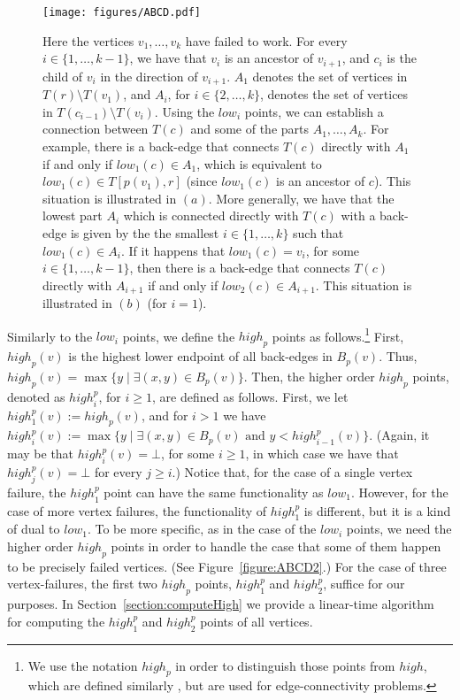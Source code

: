 \documentclass[11pt,a4paper]{article}
\begin{document}
\begin{figure}[h!]\centering
\texttt{[image: figures/ABCD.pdf]}
\caption{\small{Here the vertices $v_1,\dots,v_k$ have failed to work. For every $i\in\{1,\dots,k-1\}$, we have that $v_i$ is an ancestor of $v_{i+1}$, and $c_i$ is the child of $v_i$ in the direction of $v_{i+1}$. $A_1$ denotes the set of vertices in $T(r)\setminus T(v_1)$, and $A_i$, for $i\in\{2,\dots,k\}$, denotes the set of vertices in $T(c_{i-1})\setminus T(v_i)$. Using the $\mathit{low}_i$ points, we can establish a connection between $T(c)$ and some of the parts $A_1,\dots,A_k$. For example, there is a back-edge that connects $T(c)$ directly with $A_1$ if and only if $\mathit{low}_1(c)\in A_1$, which is equivalent to $\mathit{low}_1(c)\in T[p(v_1),r]$ (since $\mathit{low}_1(c)$ is an ancestor of $c$). This situation is illustrated in $(a)$. More generally, we have that the lowest part $A_i$ which is connected directly with $T(c)$ with a back-edge is given by the the smallest $i\in\{1,\dots,k\}$ such that $\mathit{low}_1(c)\in A_i$. If it happens that $\mathit{low}_1(c)=v_i$, for some $i\in\{1,\dots,k-1\}$, then there is a back-edge that connects $T(c)$ directly with $A_{i+1}$ if and only if $\mathit{low}_2(c)\in A_{i+1}$. This situation is illustrated in $(b)$ (for $i=1$).}}\label{figure:ABCD}
\end{figure}



Similarly to the $\mathit{low}_i$ points, we define the $\mathit{high}_p$ points as follows.\footnote{We use the notation $\mathit{high}_p$ in order to distinguish those points from $\mathit{high}$, which are defined similarly \cite{DBLP:conf/soda/Kosinas24}, but are used for edge-connectivity problems.} First, $\mathit{high}_p(v)$ is the highest lower endpoint of all back-edges in $B_p(v)$. Thus, $\mathit{high}_p(v)=\max\{y\mid \exists (x,y)\in B_p(v)\}$. Then, the higher order $\mathit{high}_p$ points, denoted as $\mathit{high}^p_i$, for $i\geq 1$, are defined as follows. First, we let $\mathit{high}^p_1(v):=\mathit{high}_p(v)$, and for $i>1$ we have $\mathit{high}^p_i(v):=\max\{y\mid \exists (x,y)\in B_p(v) \mbox{ and } y<\mathit{high}^p_{i-1}(v)\}$. (Again, it may be that $\mathit{high}^p_i(v)=\bot$, for some $i\geq 1$, in which case we have that $\mathit{high}^p_j(v)=\bot$ for every $j\geq i$.) Notice that, for the case of a single vertex failure, the $\mathit{high}^p_1$ point can have the same functionality as $\mathit{low}_1$. However, for the case of more vertex failures, the functionality of $\mathit{high}^p_1$ is different, but it is a kind of dual to $\mathit{low}_1$. To be more specific, as in the case of the $\mathit{low}_i$ points, we need the higher order $\mathit{high}_p$ points in order to handle the case that some of them happen to be precisely failed vertices. (See Figure~\ref{figure:ABCD2}.) For the case of three vertex-failures, the first two $\mathit{high}_p$ points, $\mathit{high}^p_1$ and $\mathit{high}^p_2$, suffice for our purposes. In Section~\ref{section:computeHigh} we provide a linear-time algorithm for computing the $\mathit{high}^p_1$ and $\mathit{high}^p_2$ points of all vertices.
\end{document}
